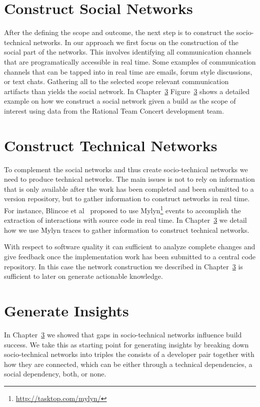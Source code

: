 \section{Construct Social Networks}
After the defining the scope and outcome, the next step is to construct the socio-technical networks.
In our approach we first focus on the construction of the social part of the networks.
This involves identifying all communication channels that are programatically accessible in real time.
Some examples of communication channels that can be tapped into in real time are emails, forum style discussions, or text chats.
Gathering all to the selected scope relevant communication artifacts than yields the social network.
In Chapter~\ref{} Figure~\ref{} shows a detailed  example on how we construct a social network given a build as the scope of interest using data from the Rational Team Concert development team.

\section{Construct Technical Networks}
To complement the social networks and thus create socio-technical networks we need to produce technical networks.
The main issues is not to rely on information that is only available after the work has been completed and been submitted to a version repository, but to gather information to construct networks in real time.
For instance, Blincoe et al~\cite{blincoe:cscw:2012} proposed to use Mylyn\footnote{\url{http://tasktop.com/mylyn/}} events to accomplish the extraction of interactions with source code in real time.
In Chapter~\ref{} we detail how we use Mylyn traces to gather information to construct technical networks.

With respect to software quality it can sufficient to analyze complete changes and give feedback once the implementation work has been submitted to a central code repository.
In this case the network construction we described in Chapter~\ref{} is sufficient to later on generate actionable knowledge.

\section{Generate Insights}
In Chapter~\ref{} we showed that gaps in socio-technical networks influence build success.
We take this as starting point for generating insights by breaking down socio-technical networks into triples the consists of a developer pair together with how they are connected, which can be either through a technical dependencies, a social dependency, both, or none.

